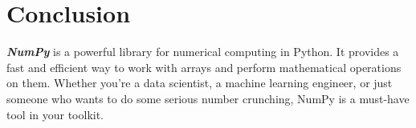 \documentclass[11pt]{article}
\begin{document}
\section{\texorpdfstring{{Conclusion}}{Conclusion}}\label{conclusion}

\textbf{\emph{NumPy}} is a powerful library for numerical computing in
Python. It provides a fast and efficient way to work with arrays and
perform mathematical operations on them. Whether you're a data
scientist, a machine learning engineer, or just someone who wants to do
some serious number crunching, NumPy is a must-have tool in your
toolkit.


    
    
    
\end{document}
